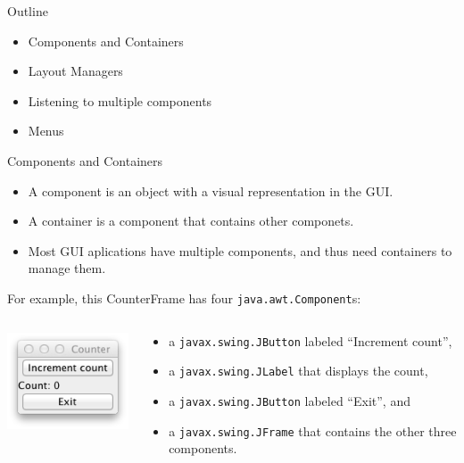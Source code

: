 \documentclass{beamer}
\author[Chris Simpkins] 
{Christopher Simpkins \\\texttt{chris.simpkins@gatech.edu}}
\institute[Georgia Tech] %
\date[CS 1331]{}
\begin{document}
\begin{frame}
  \titlepage
\end{frame}

\begin{frame}[fragile]{Outline}


\begin{itemize}
\item Components and Containers
\item Layout Managers
\item Listening to multiple components
\item Menus
\end{itemize}


\end{frame}

\begin{frame}[fragile]{Components and Containers}


\begin{itemize}
\item A component is an object with a visual representation in the GUI.
\item A container is a component that contains other componets.
\item Most GUI aplications have multiple components, and thus need containers to manage them.
\end{itemize}
For example, this CounterFrame has four {\tt java.awt.Component}s:
\begin{columns}[c]
\begin{column}{2in}
\begin{center}
\includegraphics[width=1.75in]{CounterFrame.png}
\end{center}
\end{column}
\begin{column}{3in}
\begin{itemize}
\item a {\tt javax.swing.JButton} labeled ``Increment count'',
\item a {\tt javax.swing.JLabel} that displays the count,
\item a {\tt javax.swing.JButton} labeled ``Exit'', and
\item a {\tt javax.swing.JFrame} that contains the other three components.
\end{itemize}
\end{column}
\end{columns}

\end{frame}
\end{document}
